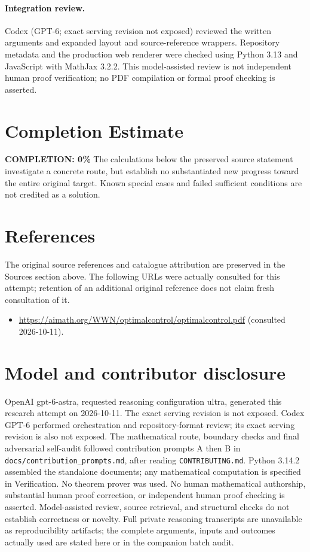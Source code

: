 \documentclass[11pt]{article}
\begin{document}
\paragraph{Integration review.} Codex (GPT-6; exact serving revision not exposed) reviewed the written arguments and expanded layout and source-reference wrappers. Repository metadata and the production web renderer were checked using Python 3.13 and JavaScript with MathJax 3.2.2. This model-assisted review is not independent human proof verification; no PDF compilation or formal proof checking is asserted.

\section{Completion Estimate}
\noindent\textbf{COMPLETION: 0\%}
The calculations below the preserved source statement investigate a concrete route,
but establish no substantiated new progress toward the entire original target.
Known special cases and failed sufficient conditions are not credited as a solution.
\section{References}
The original source references and catalogue attribution are preserved in the
Sources section above. The following URLs were actually consulted for this attempt;
retention of an additional original reference does not claim fresh consultation of it.
\begin{itemize}
\item \url{https://aimath.org/WWN/optimalcontrol/optimalcontrol.pdf} (consulted 2026-10-11). 
\end{itemize}
\section{Model and contributor disclosure}
OpenAI gpt-6-astra, requested reasoning configuration ultra, generated this research
attempt on 2026-10-11. The exact serving revision is not exposed. Codex GPT-6
performed orchestration and repository-format review; its exact serving revision
is also not exposed. The mathematical route, boundary checks and final adversarial
self-audit followed contribution prompts A then B in
\texttt{docs/contribution\_prompts.md}, after reading \texttt{CONTRIBUTING.md}.
Python 3.14.2 assembled the standalone documents; any mathematical computation is
specified in Verification. No theorem prover was used. No human mathematical
authorship, substantial human proof correction, or independent human proof checking
is asserted. Model-assisted review, source retrieval, and structural checks do not
establish correctness or novelty. Full private reasoning transcripts are unavailable
as reproducibility artifacts; the complete arguments, inputs and outcomes actually
used are stated here or in the companion batch audit.
\end{document}
